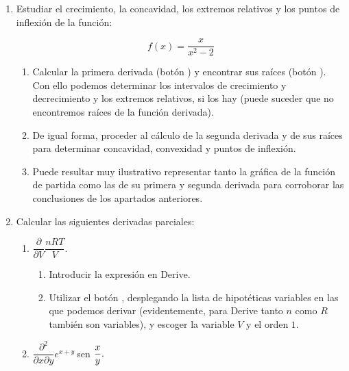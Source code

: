 \begin{enumerate}[leftmargin=*]
\item Estudiar el crecimiento, la concavidad, los extremos
relativos y los puntos de inflexión de la función:

\[
f(x)=\dfrac{x}{x^2-2}
\]


\begin{indication}
{
\begin{enumerate}
\item Calcular la primera derivada (botón ) y encontrar sus raíces (botón ). Con ello podemos determinar los intervalos de
crecimiento y decrecimiento y los extremos relativos, si los hay
(puede suceder que no encontremos raíces de la función derivada).

\item De igual forma, proceder al cálculo de la segunda derivada y
de sus raíces para determinar concavidad, convexidad y puntos de
inflexión.

\item Puede resultar muy ilustrativo representar tanto la gráfica
de la función de partida como las de su primera y segunda derivada
para corroborar las conclusiones de los apartados anteriores.

\end{enumerate}
}
\end{indication}

\item  Calcular las siguientes derivadas parciales:

\begin{enumerate}

\item  $\dfrac{\partial }{\partial V}\dfrac{nRT}{V}.$

\begin{indication}
{
\begin{enumerate}

\item Introducir la expresión en Derive.

\item Utilizar el botón , desplegando
la lista de hipotéticas variables en las que podemos derivar
(evidentemente, para Derive tanto $n$ como $R$ también son
variables), y escoger la variable $V$ y el orden $1$.

\end{enumerate}
}
\end{indication}

\item  $\dfrac{\partial ^{2}}{\partial x\partial y}e^{x+y}\ $sen$\ \dfrac{x}{%
y}.$



\end{enumerate}
\end{enumerate}
